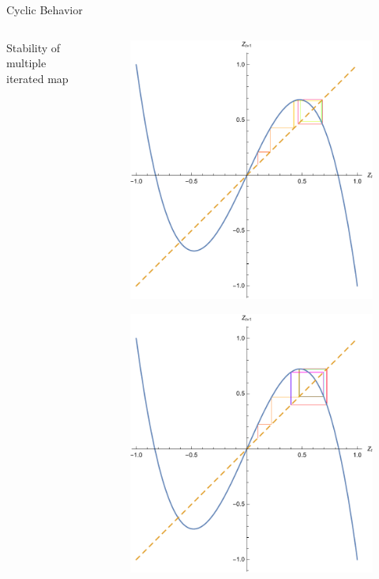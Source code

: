 \documentclass{beamer}
\begin{document}
\begin{frame}{Cyclic Behavior}
	\begin{columns}
		\begin{column}{0.5\textwidth}
			Stability of multiple iterated map
		\end{column}

		\begin{column}{0.5\textwidth}
			\begin{figure}
				\centering
				\includegraphics[height=0.4\textheight]{2_cycle.pdf}
			\end{figure}
			\begin{figure}
				\centering
				\includegraphics[height=0.4\textheight]{8_cycle.pdf}

\end{figure}
\end{column}
\end{columns}
\end{frame}
\end{document}
